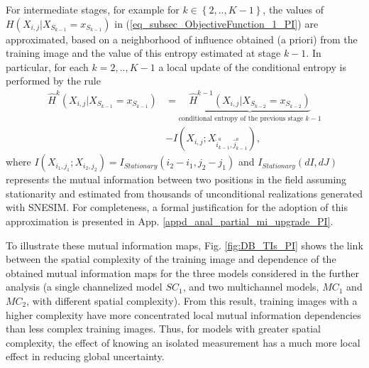 For intermediate stages, for example for $k\in  \left\{2,..,K-1\right\}$, the values of $H(X_{i,j}| X_{S_{k-1}} = x_{S_{k-1}} )$ in (\ref{eq_subsec_ObjectiveFunction_1_PI}) are approximated,  based on a neighborhood of influence obtained (a priori) from the training image and the  value of this entropy estimated at stage $k-1$. 
In particular, for each $k=2,..,K-1$ a local update of the conditional entropy is performed by the rule
\begin{align}\label{eq_subsec_ObjectiveFunction_4_PI}
	\hat{H}^{k}(X_{i,j}| X_{S_{k-1}} = x_{S_{k-1}} )  &= \underbrace{\hat{H}^{k-1}(X_{i,j}| X_{S_{k-2}} = x_{S_{k-2}} )}_{\text{conditional entropy of the previous stage $k-1$}}\nonumber\\ 
	&- I(X_{i,j}; X_{\hat{i}^a_{k-1}, \hat{j}^a_{k-1}}),
\end{align}
where $I(X_{i_{1},j_{1}};X_{i_{2},j_{2}}) = I_{Stationary}(i_{2} - i_{1}, j_{2} - j_{1})$ and $I_{Stationary}(dI,dJ)$ represents the mutual information between two positions in the field assuming stationarity and estimated from thousands of unconditional realizations generated with {SNESIM}. {For completeness, a formal  justification for the adoption of this approximation is presented in App. \ref{appd_anal_partial_mi_upgrade_PI}.}

To illustrate these mutual information maps, Fig. \ref{fig:DB_TIs_PI} shows the link between the spatial complexity of the training image and dependence of the obtained mutual information maps for the three models considered in the further analysis (a single channelized model $SC_1$, and two multichannel models, $MC_1$ and $MC_2$, with different spatial complexity). From this result,  {training images with a higher complexity have more concentrated local mutual information dependencies than less complex training images. Thus, for models with greater spatial complexity, the effect of knowing an isolated measurement has a much more local effect in reducing global uncertainty}. 

